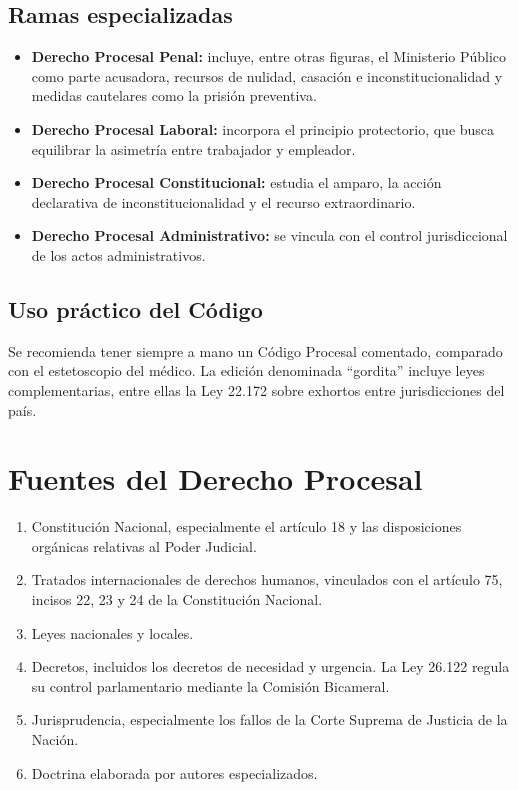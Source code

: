 \documentclass[12pt,oneside]{book}
\begin{document}
\subsection{Ramas especializadas}
\begin{itemize}
\item \textbf{Derecho Procesal Penal:} incluye, entre otras figuras, el Ministerio Público como parte acusadora, recursos de nulidad, casación e inconstitucionalidad y medidas cautelares como la prisión preventiva.
\item \textbf{Derecho Procesal Laboral:} incorpora el principio protectorio, que busca equilibrar la asimetría entre trabajador y empleador.
\item \textbf{Derecho Procesal Constitucional:} estudia el amparo, la acción declarativa de inconstitucionalidad y el recurso extraordinario.
\item \textbf{Derecho Procesal Administrativo:} se vincula con el control jurisdiccional de los actos administrativos.
\end{itemize}

\subsection{Uso práctico del Código}
Se recomienda tener siempre a mano un Código Procesal comentado, comparado con el estetoscopio del médico. La edición denominada ``gordita'' incluye leyes complementarias, entre ellas la Ley 22.172 sobre exhortos entre jurisdicciones del país.

\section{Fuentes del Derecho Procesal}
\begin{enumerate}
\item Constitución Nacional, especialmente el artículo 18 y las disposiciones orgánicas relativas al Poder Judicial.
\item Tratados internacionales de derechos humanos, vinculados con el artículo 75, incisos 22, 23 y 24 de la Constitución Nacional.
\item Leyes nacionales y locales.
\item Decretos, incluidos los decretos de necesidad y urgencia. La Ley 26.122 regula su control parlamentario mediante la Comisión Bicameral.
\item Jurisprudencia, especialmente los fallos de la Corte Suprema de Justicia de la Nación.
\item Doctrina elaborada por autores especializados.
\end{enumerate}
\end{document}

